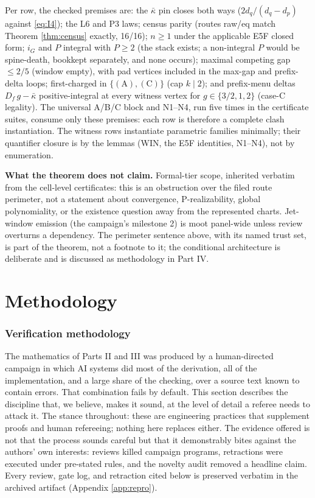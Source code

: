 \documentclass[11pt]{article}
\theoremstyle{definition}
\theoremstyle{remark}
\newcommand{\kb}{\bar\kappa}
\begin{document}
Per row, the checked premises are: the $\kb$ pin closes both ways ($2d_q/(d_q-d_p)$ against \eqref{eq:I4}); the L6 and P3 laws; census parity (routes raw/eq match Theorem \ref{thm:census} exactly, 16/16); $n\geq1$ under the applicable E5F closed form; $i_G$ and $P$ integral with $P\geq2$ (the stack exists; a non-integral $P$ would be spine-death, bookkept separately, and none occurs); maximal competing gap $\leq2/5$ (window empty), with pad vertices included in the max-gap and prefix-delta loops; first-charged in $\{(\mathrm A),(\mathrm C)\}$ (cap $k\mid2$); and prefix-menu deltas $D_f\,g-\kb$ positive-integral at every witness vertex for $g\in\{3/2,1,2\}$ (case-C legality). The universal A/B/C block and N1--N4, run five times in the certificate suites, consume only these premises: each row is therefore a complete clash instantiation. The witness rows instantiate parametric families minimally; their quantifier closure is by the lemmas (WIN, the E5F identities, N1--N4), not by enumeration.

\medskip
\noindent\textbf{What the theorem does not claim.} Formal-tier scope, inherited verbatim from the cell-level certificates: this is an obstruction over the filed route perimeter, not a statement about convergence, P-realizability, global polynomiality, or the existence question away from the represented charts. Jet-window emission (the campaign's milestone 2) is moot panel-wide unless review overturns a dependency. The perimeter sentence above, with its named trust set, is part of the theorem, not a footnote to it; the conditional architecture is deliberate and is discussed as methodology in Part IV.

\part{Methodology}

\section{Verification methodology}\label{sec:method}

The mathematics of Parts II and III was produced by a human-directed campaign in which AI systems did most of the derivation, all of the implementation, and a large share of the checking, over a source text known to contain errors. That combination fails by default. This section describes the discipline that, we believe, makes it sound, at the level of detail a referee needs to attack it. The stance throughout: these are engineering practices that supplement proofs and human refereeing; nothing here replaces either. The evidence offered is not that the process sounds careful but that it demonstrably bites against the authors' own interests: reviews killed campaign programs, retractions were executed under pre-stated rules, and the novelty audit removed a headline claim. Every review, gate log, and retraction cited below is preserved verbatim in the archived artifact (Appendix \ref{app:repro}).
\end{document}
